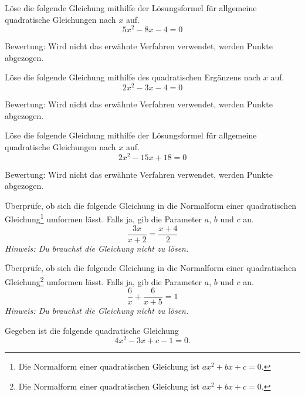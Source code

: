 \documentclass[11pt]{exam}
\begin{document}
\begin{questions}
\question[4]
Löse die folgende Gleichung mithilfe der Lösungsformel für allgemeine quadratische Gleichungen nach $x$ auf. \[5x^2-8x-4=0\]
\begin{small}
    Bewertung: Wird nicht das erwähnte Verfahren verwendet, werden Punkte abgezogen.
\end{small}

\question[4]
Löse die folgende Gleichung mithilfe des quadratischen Ergänzens nach $x$ auf. \[2x^2-3x-4=0\]
\begin{small}
    Bewertung: Wird nicht das erwähnte Verfahren verwendet, werden Punkte abgezogen.
\end{small}

\question[4]
Löse die folgende Gleichung mithilfe der Lösungsformel für allgemeine quadratische Gleichungen nach $x$ auf. \[2x^2-15x+18=0\]
\begin{small}
    Bewertung: Wird nicht das erwähnte Verfahren verwendet, werden Punkte abgezogen.
\end{small}

\question[4]
Überprüfe, ob sich die folgende Gleichung in die Normalform einer quadratischen Gleichung\footnote{Die Normalform einer quadratischen Gleichung ist $ax^2+bx+c=0$.} umformen lässt. Falls ja, gib die Parameter $a$, $b$ und $c$ an.
\[\frac{3x}{x+2}=\frac{x+4}{2}\]
\textit{Hinweis: Du brauchst die Gleichung nicht zu lösen.}


\question[4]
Überprüfe, ob sich die folgende Gleichung in die Normalform einer quadratischen Gleichung\footnote{Die Normalform einer quadratischen Gleichung ist $ax^2+bx+c=0$.} umformen lässt. Falls ja, gib die Parameter $a$, $b$ und $c$ an.
\[\frac{6}{x}+\frac{6}{x+5}=1\]
\textit{Hinweis: Du brauchst die Gleichung nicht zu lösen.}


\noaddpoints
\question[\totalpoints]
\addpoints
Gegeben ist die folgende quadratische Gleichung
\[4x^2-3x+c-1=0.\]
\end{questions}
\end{document}
